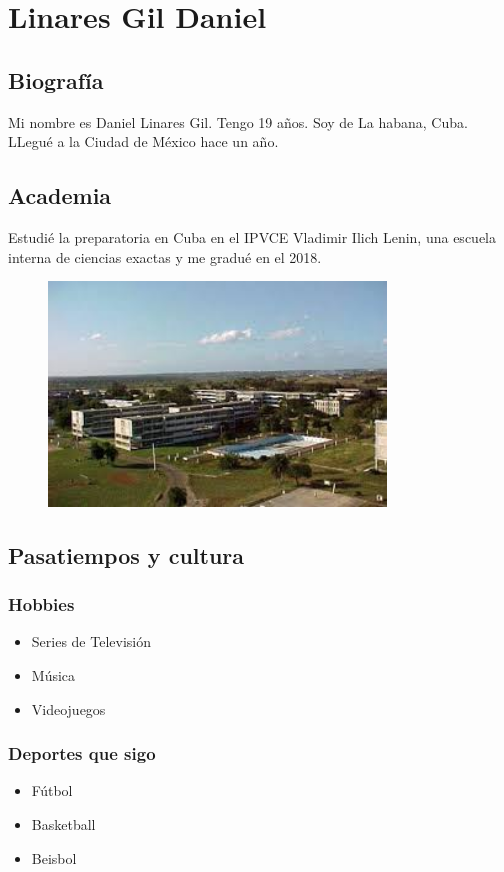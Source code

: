 \chapter{Linares Gil Daniel}



\section{Biografía}
Mi nombre es Daniel Linares Gil. Tengo 19 años. Soy de La habana, Cuba. LLegué a la Ciudad de México hace un año.

\section{Academia}
Estudié la preparatoria en Cuba en el IPVCE Vladimir Ilich Lenin, una escuela interna de ciencias exactas y me gradué en el 2018.\\

\begin{figure}
  \centering
  \includegraphics[width=0.8\textwidth]{420490056/1.jpg}
\end{figure}

\section{Pasatiempos y cultura}

\subsection{Hobbies}
\begin{itemize}
\item{Series de Televisión}
\item{Música}
\item{Videojuegos}
\end{itemize}

\subsection{Deportes que sigo}
\begin{itemize}
\item{Fútbol}
\item{Basketball}
\item{Beisbol}
\end{itemize}
